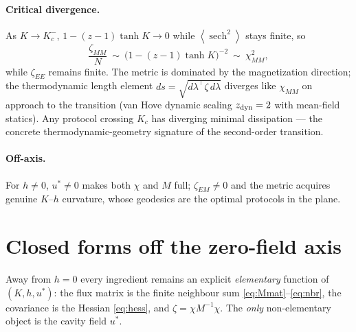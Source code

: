 \documentclass[11pt]{article}
\newcommand{\sech}{\operatorname{sech}}
\newcommand{\avg}[1]{\left\langle #1 \right\rangle}
\begin{document}
\paragraph{Critical divergence.} As $K\to K_c^-$, $1-(z-1)\tanh K\to0$ while $\avg{\sech^2}$ stays
finite, so
\begin{equation}
\frac{\zeta_{MM}}N\ \sim\ \big(1-(z-1)\tanh K\big)^{-2}\ \sim\ \chi_{MM}^2 ,
\end{equation}
while $\zeta_{EE}$ remains finite. The metric is dominated by the magnetization direction; the
thermodynamic length element $ds=\sqrt{d\lambda^\top\zeta\,d\lambda}$ diverges like $\chi_{MM}$ on
approach to the transition (van Hove dynamic scaling $z_{\rm dyn}=2$ with mean-field statics). Any
protocol crossing $K_c$ has diverging minimal dissipation --- the concrete thermodynamic-geometry
signature of the second-order transition.

\paragraph{Off-axis.} For $h\ne0$, $u^*\ne0$ makes both $\chi$ and $M$ full; $\zeta_{EM}\ne0$ and the
metric acquires genuine $K$--$h$ curvature, whose geodesics are the optimal protocols in the plane.

\section{Closed forms off the zero-field axis}

Away from $h=0$ every ingredient remains an explicit \emph{elementary} function of $(K,h,u^*)$: the
flux matrix is the finite neighbour sum \eqref{eq:Mmat}--\eqref{eq:nbr}, the covariance is the Hessian
\eqref{eq:hess}, and $\zeta=\chi M^{-1}\chi$. The \emph{only} non-elementary object is the cavity
field $u^*$.
\end{document}
